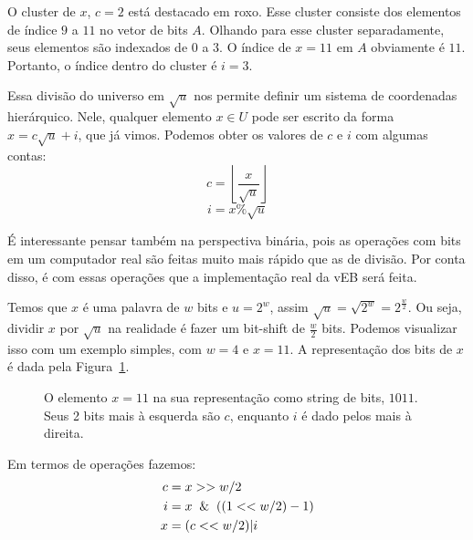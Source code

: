 O cluster de $x$, $c=2$ está destacado em roxo. Esse cluster consiste dos
elementos de índice $9$ a $11$ no vetor de bits $A$. Olhando para esse cluster
separadamente, seus elementos são indexados de $0$ a $3$. O índice de $x=11$ em
$A$ obviamente é $11$. Portanto, o índice dentro do cluster é $i=3$.

Essa divisão do universo em $\sqrt{u}$ nos permite definir um sistema de
coordenadas hierárquico. Nele, qualquer elemento $x \in U$ pode ser escrito da
forma $x=c\sqrt u + i$, que já vimos. Podemos obter os valores de $c$ e $i$ com
algumas contas:
\[
c = \left \lfloor \frac{x}{\sqrt u} \right \rfloor 
\]
\[
i = x \% \sqrt u
\]

É interessante pensar também na perspectiva binária, pois as operações com bits
em um computador real são feitas muito mais rápido que as de divisão. Por conta
disso, é com essas operações que a implementação real da vEB será feita. 

Temos que $x$ é uma palavra de $w$ bits e $u= 2^w$, assim $\sqrt u = \sqrt{2^w}
= 2^{\frac{w}{2}}$. Ou seja, dividir $x$ por $\sqrt u$ na realidade é fazer um
bit-shift de $\frac{w}{2}$ bits. Podemos visualizar isso com um exemplo simples,
com $w=4$ e $x=11$. A representação dos bits de $x$ é dada pela
Figura~\ref{f:veb-hierarch-coords}.

\begin{figure}[h]
\centering
{}
\caption{O elemento $x=11$ na sua representação como string de bits, $1011$.
Seus 2 bits mais à esquerda são $c$, enquanto $i$ é dado pelos mais à
direita.\label{f:veb-hierarch-coords}}
\end{figure}

Em termos de operações fazemos:
\begin{align*}
c & = x >> w/2 \\
i & = x \And ((1 << w/2)-1) \\
x & = (c << w/2) | i
\end{align*}

